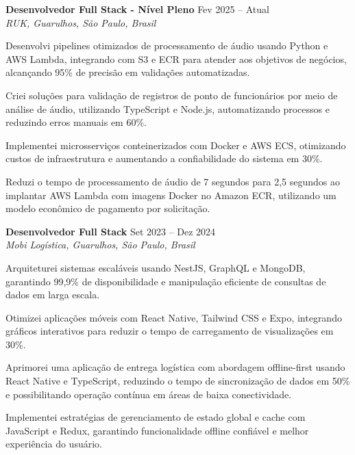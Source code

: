 \documentclass[11pt,letterpaper]{article}
\begin{document}
\textbf{Desenvolvedor Full Stack - Nível Pleno} \hfill Fev 2025 – Atual \\
\textit{RUK, Guarulhos, São Paulo, Brasil}
\begin{achievements}
    \item Desenvolvi pipelines otimizados de processamento de áudio usando Python e AWS Lambda, integrando com S3 e ECR para atender aos objetivos de negócios, alcançando 95\% de precisão em validações automatizadas.
    \item Criei soluções para validação de registros de ponto de funcionários por meio de análise de áudio, utilizando TypeScript e Node.js, automatizando processos e reduzindo erros manuais em 60\%.
    \item Implementei microsserviços conteinerizados com Docker e AWS ECS, otimizando custos de infraestrutura e aumentando a confiabilidade do sistema em 30\%.
    \item Reduzi o tempo de processamento de áudio de 7 segundos para 2,5 segundos ao implantar AWS Lambda com imagens Docker no Amazon ECR, utilizando um modelo econômico de pagamento por solicitação.
\end{achievements}

\textbf{Desenvolvedor Full Stack} \hfill Set 2023 – Dez 2024 \\
\textit{Mobi Logística, Guarulhos, São Paulo, Brasil}
\begin{achievements}
    \item Arquiteturei sistemas escaláveis usando NestJS, GraphQL e MongoDB, garantindo 99,9\% de disponibilidade e manipulação eficiente de consultas de dados em larga escala.
    \item Otimizei aplicações móveis com React Native, Tailwind CSS e Expo, integrando gráficos interativos para reduzir o tempo de carregamento de visualizações em 30\%.
    \item Aprimorei uma aplicação de entrega logística com abordagem offline-first usando React Native e TypeScript, reduzindo o tempo de sincronização de dados em 50\% e possibilitando operação contínua em áreas de baixa conectividade.
    \item Implementei estratégias de gerenciamento de estado global e cache com JavaScript e Redux, garantindo funcionalidade offline confiável e melhor experiência do usuário.
\end{achievements}
\end{document}
